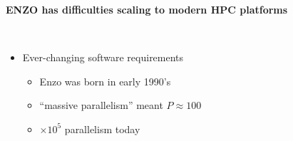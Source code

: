 \begin{frame}[fragile]



\secframetitle{\ssMotivation}
 \centerline{\textbf{ENZO has difficulties scaling to modern HPC platforms}} \ \\
 \begin{minipage}{3in}
\pause
  \begin{itemize}
   \item Ever-changing software requirements
     \begin{itemize}
\footnotesize
   \item  Enzo was born in early 1990's
   \item ``massive parallelism'' meant $P\approx 100$
   \item $\times 10^5$ parallelism today
     \end{itemize}
   

\end{itemize}
\end{minipage}
\end{frame}
